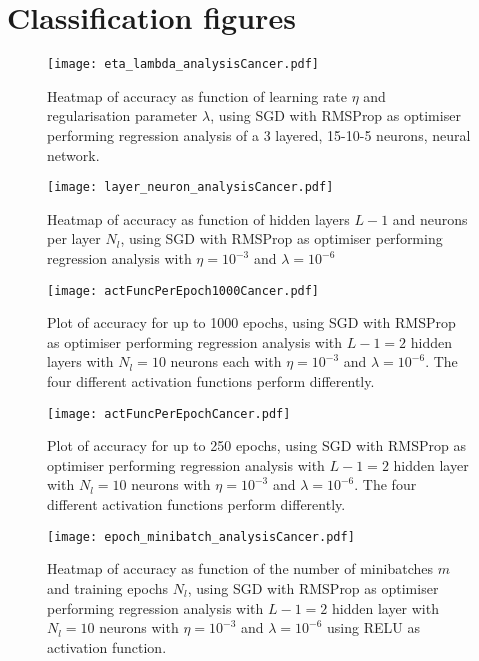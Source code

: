 \clearpage

\section{Classification figures}

\begin{figure}[h!]
    \texttt{[image: eta\_lambda\_analysisCancer.pdf]}
    \caption{Heatmap of accuracy as function of learning rate $\eta$ and regularisation parameter $\lambda$, using SGD with RMSProp as optimiser performing regression analysis of a 3 layered, 15-10-5 neurons, neural network. }
    \label{fig:class_eta_lambda}
\end{figure}

\begin{figure}[h!]
    \texttt{[image: layer\_neuron\_analysisCancer.pdf]}
    \caption{Heatmap of accuracy as function of hidden layers $L-1$ and neurons per layer $N_l$, using SGD with RMSProp as optimiser performing regression analysis with $\eta=10^{-3}$ and $\lambda=10^{-6}$ }
    \label{fig:class_layer_neuron}
\end{figure}

\begin{figure}[h!]
    \texttt{[image: actFuncPerEpoch1000Cancer.pdf]}
    \caption{Plot of accuracy for up to 1000 epochs, using SGD with RMSProp as optimiser performing regression analysis with $L-1=2$ hidden layers with $N_l=10$ neurons each with $\eta=10^{-3}$ and $\lambda=10^{-6}$. The four different activation functions perform differently.}
    \label{fig:class_act_epoch1000}
\end{figure}

\begin{figure}[h!]
    \texttt{[image: actFuncPerEpochCancer.pdf]}
    \caption{Plot of accuracy for up to 250 epochs, using SGD with RMSProp as optimiser performing regression analysis with $L-1=2$ hidden layer with $N_l=10$ neurons with $\eta=10^{-3}$ and $\lambda=10^{-6}$. The four different activation functions perform differently.}
    \label{fig:class_act_epoch}
\end{figure}

\begin{figure}[h!]
    \texttt{[image: epoch\_minibatch\_analysisCancer.pdf]}
    \caption{Heatmap of accuracy as function of the number of minibatches $m$ and training epochs $N_l$, using SGD with RMSProp as optimiser performing regression analysis with $L-1=2$ hidden layer with $N_l=10$ neurons with $\eta=10^{-3}$ and $\lambda=10^{-6}$ using RELU as activation function. }
    \label{fig:class_minibatch_epoch}
\end{figure}